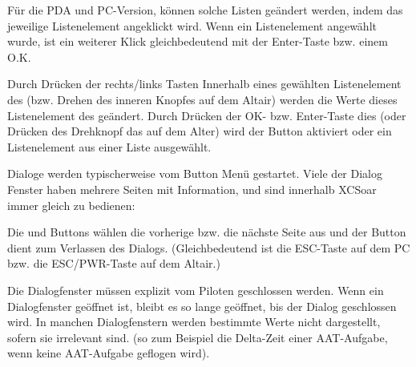Für die PDA und \textsf{PC}-Version, können solche Listen geändert werden, indem das jeweilige Listenelement angeklickt wird.
Wenn ein Listenelement angewählt wurde, ist ein weiterer Klick gleichbedeutend mit der Enter-Taste bzw. einem O.K.

Durch Drücken der rechts/links Tasten Innerhalb eines gewählten Listenelement des (bzw. Drehen des inneren Knopfes auf dem \textsf{Altair}) werden die Werte dieses Listenelement des geändert. Durch Drücken der OK- bzw. Enter-Taste dies (oder Drücken des Drehknopf das auf dem Alter) wird der Button aktiviert oder ein Listenelement aus einer Liste ausgewählt.

Dialoge werden typischerweise vom Button Menü gestartet. Viele der Dialog Fenster haben mehrere Seiten mit Information, und sind innerhalb \textsf{XCSoar} immer gleich zu bedienen:

Die \button{$<$} und \button{$>$} Buttons wählen die vorherige bzw. die nächste Seite aus und der
 Button dient  zum Verlassen des Dialogs. (Gleichbedeutend ist die ESC-Taste auf dem \textsf{PC} bzw. die ESC/PWR-Taste  auf dem \textsf{Altair}.)

Die Dialogfenster müssen explizit vom Piloten geschlossen werden. Wenn ein Dialogfenster geöffnet ist, bleibt es so lange geöffnet, bis der Dialog geschlossen wird. In manchen Dialogfenstern werden bestimmte  Werte nicht dargestellt, sofern sie irrelevant sind. (so zum Beispiel die Delta-Zeit einer AAT-Aufgabe, wenn keine AAT-Aufgabe geflogen wird).


